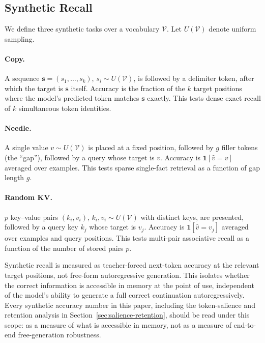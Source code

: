 \documentclass[10pt]{article} %
\begin{document}
\subsection{Synthetic Recall}
\label{sec:synthetic-recall}
We define three synthetic tasks over a vocabulary $\mathcal{V}$. Let
$U(\mathcal{V})$ denote uniform sampling.

\paragraph{Copy.} A sequence $\mathbf{s} = (s_1, \dots, s_k)$, $s_i \sim
U(\mathcal{V})$, is followed by a delimiter token, after which the target
is $\mathbf{s}$ itself. Accuracy is the fraction of the $k$ target
positions where the model's predicted token matches $\mathbf{s}$ exactly.
This tests dense exact recall of $k$ simultaneous token identities.

\paragraph{Needle.} A single value $v \sim U(\mathcal{V})$ is placed at a
fixed position, followed by $g$ filler tokens (the ``gap''), followed by a
query whose target is $v$. Accuracy is $\mathbf{1}[\hat v = v]$ averaged
over examples. This tests sparse single-fact retrieval as a function of
gap length $g$.

\paragraph{Random KV.} $p$ key--value pairs $(k_i, v_i)$, $k_i, v_i \sim
U(\mathcal{V})$ with distinct keys, are presented, followed by a query key
$k_j$ whose target is $v_j$. Accuracy is $\mathbf{1}[\hat v = v_j]$
averaged over examples and query positions. This tests multi-pair
associative recall as a function of the number of stored pairs $p$.

Synthetic recall is measured as teacher-forced next-token accuracy at the
relevant target positions, not free-form autoregressive generation. This
isolates whether the correct information is accessible in memory at the
point of use, independent of the model's ability to generate a full
correct continuation autoregressively. Every synthetic accuracy number in
this paper, including the token-salience and retention analysis in
Section~\ref{sec:salience-retention}, should be read under this scope: as a
measure of what is accessible in memory, not as a measure of end-to-end
free-generation robustness.
\end{document}

